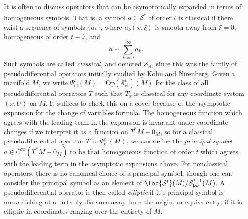 It is often to discuss operators that can be asymptotically expanded in terms of homogeneous symbols. That is, a symbol $a \in \dot{\mathcal{S}}^t$ of order $t$ is classical if there exist a sequence of symbols $\{ a_k \}$, where $a_k(x,\xi)$ is smooth away from $\xi = 0$, homogeneous of order $t - k$, and
%
\[ a \sim \sum_{k = 0}^\infty a_k. \]
%
Such symbols are called \emph{classical}, and denoted $\mathcal{S}^t_{\text{cl}}$, since this was the family of pseudodifferential operators initially studied by Kohn and Nirenberg. Given a manifold $M$, we write $\Psi_{\text{cl}}^t(M) = \text{Op}(\mathcal{S}^t_{\text{cl}})(M)$ for the class of all pseudodifferential operators $T$ such that $T_x$ is classical for any coordinate system $(x,U)$ on $M$. It suffices to check this on a cover because of the asymptotic expansion for the change of variables formula. The homogeneous function which agrees with the leading term in the expansion is invariant under coordinate changes if we interpret it as a function on $T^* M - 0_M$, so for a classical pseudodifferential operator $T$ in $\Psi_{\text{cl}}^t(M)$, we can define the \emph{principal symbol} $a \in C^\infty(T^* M - 0_M)$ to be that homogeneous function of order $t$ which agrees with the leading term in the asymptotic expansions above. For nonclassical operators, there is no canonical choice of a principal symbol, though one can consider the principal symbol as an element of $\loc{\mathcal{S}^t}(M) / \mathcal{S}^{t-1}_{\text{loc}}(M)$. A pseudodifferential operator is then called \emph{elliptic} if it's principal symbol is nonvanishing at a suitably distance away from the origin, or equivalently, if it is elliptic in coordinates ranging over the entirety of $M$.


